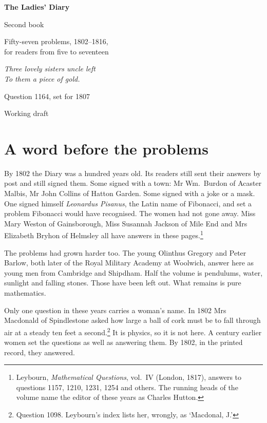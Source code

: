 \documentclass[11pt,a4paper]{article}
\newcounter{prob}
\begin{document}
\begin{titlepage}
\centering
\vspace*{3cm}
{\Huge\bfseries The Ladies' Diary\par}
\vspace{0.4cm}
{\LARGE Second book\par}
\vspace{0.8cm}
{\Large Fifty-seven problems, 1802--1816,\\ for readers from five to seventeen\par}
\vspace{2cm}
{\large\itshape Three lovely sisters uncle left\\ To them a piece of gold.\par}
\vspace{0.3cm}
{\small Question 1164, set for 1807\par}
\vfill
{\large Working draft\par}
\end{titlepage}

\section*{A word before the problems}

By 1802 the Diary was a hundred years old. Its readers still sent their answers by post
and still signed them. Some signed with a town: Mr Wm.~Burdon of Acaster Malbis,
Mr John Collins of Hatton Garden. Some signed with a joke or a mask. One signed himself
\textit{Leonardus Pisanus}, the Latin name of Fibonacci, and set a problem Fibonacci
would have recognised. The women had not gone away. Miss Mary Weston of Gainsborough,
Miss Susannah Jackson of Mile End and Mrs Elizabeth Bryhon of Helmsley all have answers
in these pages.\footnote{Leybourn, \textit{Mathematical Questions}, vol.~IV (London,
1817), answers to questions 1157, 1210, 1231, 1254 and others. The running heads of
the volume name the editor of these years as Charles Hutton.}

The problems had grown harder too. The young Olinthus Gregory and Peter Barlow, both
later of the Royal Military Academy at Woolwich, answer here as young men from Cambridge and
Shipdham. Half the volume is pendulums, water, sunlight and falling stones. Those have
been left out. What remains is pure mathematics.

Only one question in these years carries a woman's name. In 1802 Mrs Macdonald of
Spindlestone asked how large a ball of cork must be to fall through air at a steady ten
feet a second.\footnote{Question 1098. Leybourn's index lists her, wrongly, as
`Macdonal, J.'} It is physics, so it is not here. A century earlier women set the
questions as well as answering them. By 1802, in the printed record, they answered.
\end{document}
